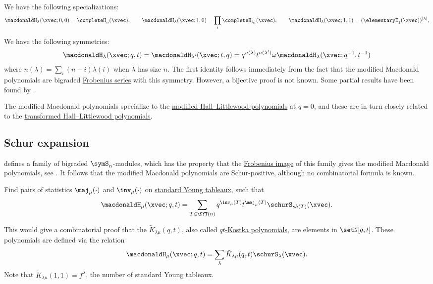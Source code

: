 We have the following specializations:
\[
\macdonaldH_{\lambda}(\xvec;0,0) = \completeH_{n}(\xvec),
\qquad
\macdonaldH_{\lambda}(\xvec;1,0)
=
\prod_i \completeH_{\lambda_i}(\xvec),
\qquad
\macdonaldH_{\lambda}(\xvec;1,1)
=
(\elementaryE_1(\xvec))^{|\lambda|},
\]

We have the following symmetries:
\[
\macdonaldH_{\lambda}(\xvec;q,t) = \macdonaldH_{\lambda'}(\xvec;t,q)
= q^{n(\lambda)} t^{n(\lambda')}\omega \macdonaldH_{\lambda}(\xvec;q^{-1},t^{-1})
\]
where $n(\lambda) = \sum_i (n-i)\lambda(i)$ when $\lambda$ has size $n$.
The first identity follows immediately from the fact that the modified
Macdonald polynomials are bigraded
\hyperref[frobeniusCharacteristic]{Frobenius series} with this symmetry.
However, a bijective proof is not known.
Some partial results have been found by 
\cite{Gillespie2016}.

The modified Macdonald polynomials specialize to the
\hyperref[hallLittlewoodH]{modified Hall--Littlewood polynomials} at $q=0$,
and these are in turn closely related to the
\hyperref[hallLittlewoodT]{transformed Hall--Littlewood polynomials}.



\subsection[macdonaldHSchurPositivity]{Schur expansion}

 defines a family of bigraded $\symS_n$-modules,
which has the property that the \hyperref[frobeniusCharacteristic]{Frobenius image}
of this family gives the modified Macdonald polynomials, see \cite{Haiman2001}.
It follows that the modified Macdonald polynomials are Schur-positive, although
no combinatorial formula is known.


\begin{problem}
Find pairs of statistics $\maj_\mu(\cdot)$ and $\inv_\mu(\cdot)$
on \hyperref[standardYoungTableau]{standard Young tableaux}, such that
\[
\macdonaldH_{\mu}(\xvec;q,t)
=
\sum_{T \in \SYT(n)}
q^{\inv_\mu(T)} t^{\maj_\mu(T)} \schurS_{sh(T)}(\xvec).
\]

This would give a combinatorial proof that the
\label{modifiedMacdonaldKostkaPolynomial}
$\tilde{K}_{\lambda\mu}(q,t)$, also called
\hyperref[qtKostkaPolynomial]{$qt$-Kostka polynomials}, are elements in
$\setN[q,t]$.
These polynomials are defined via the relation
\[
\macdonaldH_{\mu}(\xvec;q,t)
=
\sum_{\lambda} \tilde{K}_{\lambda\mu}(q,t) \schurS_{\lambda}(\xvec).
\]
Note that $\tilde{K}_{\lambda\mu}(1,1) = f^\lambda$, the number of standard
Young tableaux.
\end{problem}


